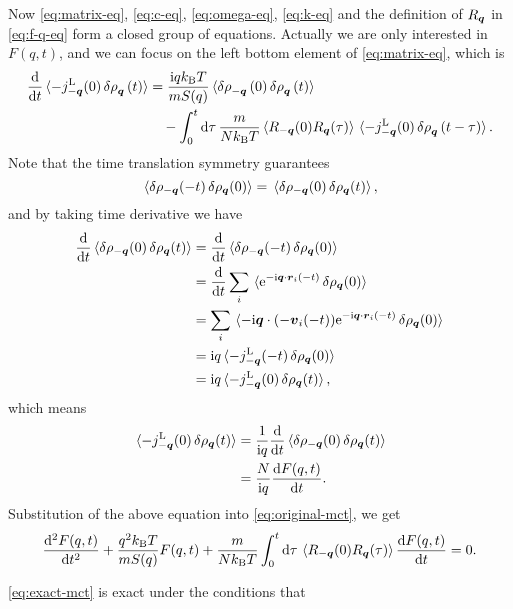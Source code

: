 \documentclass[hyperref, a4paper]{article}
\newcommand*{\ii}{\mathrm{i}}
\newcommand*{\ee}{\mathrm{e}}
\begin{document}
Now \eqref{eq:matrix-eq}, \eqref{eq:c-eq}, \eqref{eq:omega-eq}, \eqref{eq:k-eq} and the definition of $R_{\vb*{q}}$ 
in \eqref{eq:f-q-eq} form a closed group of equations. Actually we are only interested in $F(q, t)$,
and we can focus on the left bottom element of \eqref{eq:matrix-eq}, which is 
\begin{equation}
    \begin{aligned}
        \dv{t} \expval*{ - j^\text{L}_{-\vb*{q}}(0) \var{\rho}_{\vb*{q}}(t) } 
        &= \frac{\ii q k_\text{B} T}{m S(q)} \expval*{ \var{\rho}_{-\vb*{q}}(0) \var{\rho}_{\vb*{q}}(t) } \\
        &\quad - \int_0^t \dd{\tau} \frac{m}{N k_\text{B} T} \expval*{R_{-\vb*{q}}(0) R_{\vb*{q}}(\tau)} \expval*{ - j^\text{L}_{-\vb*{q}}(0) \var{\rho}_{\vb*{q}}(t - \tau) } .
    \end{aligned}
    \label{eq:original-mct}
\end{equation}
Note that the time translation symmetry guarantees
\[
    \expval*{\var{\rho_{-\vb*{q}}(-t)} \var{\rho_{\vb*{q}}(0)}} = \expval*{\var{\rho_{-\vb*{q}}(0)} \var{\rho_{\vb*{q}}(t)}},
\]
and by taking time derivative we have 
\[
    \begin{aligned}
        \dv{t} \expval*{\var{\rho_{-\vb*{q}}(0)} \var{\rho_{\vb*{q}}(t)}} &= 
        \dv{t} \expval*{\var{\rho_{-\vb*{q}}(-t)} \var{\rho_{\vb*{q}}(0)}} \\
        &= \dv{t} \sum_i \expval*{\ee^{- \ii \vb*{q} \cdot \vb*{r}_i (-t)} \var{\rho_{\vb*{q}}(0)}}  \\
        &= \sum_i \expval*{ - \ii \vb*{q} \cdot (- \vb*{v}_i(-t)) \ee^{- \ii \vb*{q} \cdot \vb*{r}_i (-t)} \var{\rho_{\vb*{q}}(0)}}  \\
        &= \ii q \expval*{- j^\text{L}_{-\vb*{q}}(-t) \var{\rho_{\vb*{q}}(0)}} \\
        &= \ii q \expval*{- j^\text{L}_{-\vb*{q}}(0) \var{\rho_{\vb*{q}}(t)}},
    \end{aligned}
\]
which means 
\[
    \begin{aligned}
        \expval*{- j^\text{L}_{-\vb*{q}}(0) \var{\rho_{\vb*{q}}(t)}} 
        &= \frac{1}{\ii q} \dv{t} \expval*{\var{\rho_{-\vb*{q}}(0)} \var{\rho_{\vb*{q}}(t)}} \\
        &= \frac{N}{\ii q} \dv{F(q, t)}{t} .
    \end{aligned}
\]
Substitution of the above equation into \eqref{eq:original-mct}, we get 
\begin{equation}
    \dv[2]{F(q, t)}{t} + \frac{q^2 k_\text{B} T}{m S(q)} F(q, t) + \frac{m}{N k_\text{B} T} \int_0^t \dd{\tau} \expval*{R_{-\vb*{q}}(0) R_{\vb*{q}}(\tau)} \dv{F(q, t)}{t} = 0.
    \label{eq:exact-mct}
\end{equation}

\eqref{eq:exact-mct} is exact under the conditions that 


 
\end{document}
